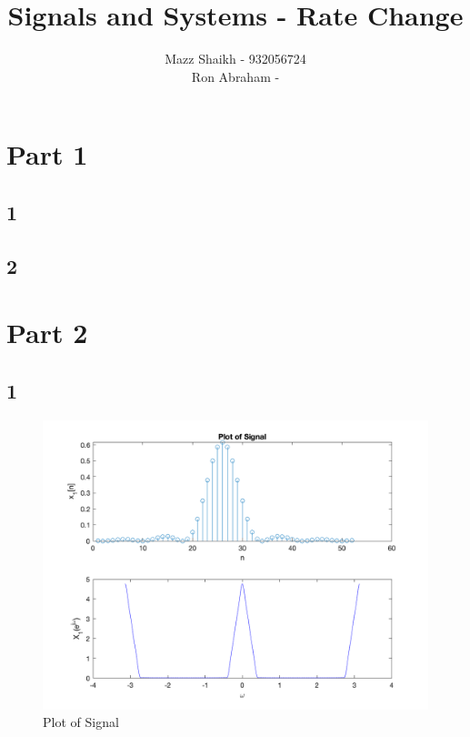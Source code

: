 \documentclass{article}
\title{Signals and Systems - Rate Change}
\author{Mazz Shaikh - 932056724\\ Ron Abraham - }
\begin{document}
\maketitle

\section*{Part 1}
\subsection*{1}
\subsection*{2}

\newpage

\section*{Part 2}

\subsection*{1}
 
\begin{figure}[H]
    \centering
    \includegraphics[scale=0.4]{Plot of Signal.png}
    \caption{Plot of Signal}
    \label{Plot of Signal}
\end{figure}
\end{document}
